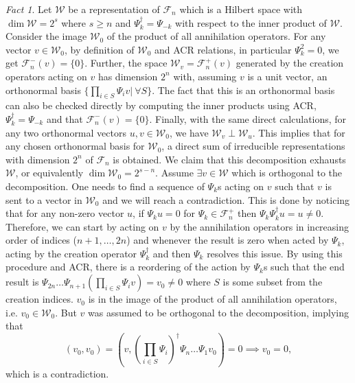 \documentclass[twoside,11pt,titlepage]{amsart}
\renewcommand{\=}[1]{\stackrel{#1}{=}} %
\theoremstyle{definition}
\theoremstyle{remark}
\newtheorem{fct}{Fact}
\begin{document}
\begin{fct}\label{fct1}
Let $\mathcal{W}$ be a representation of $\mathcal{F}_n$ which is a Hilbert space with $\dim \mathcal{W}=2^s$  where $s \ge n$ and $\Psi_k^\dagger=\Psi_{-k}$ with respect to the inner product of $\mathcal{W}$. Consider the image $\mathcal{W}_0$ of the product of all annihilation operators. For any vector $v \in \mathcal{W}_0$, by definition of $\mathcal{W}_0$ and ACR relations, in particular $\Psi_k^2=0$, we get $\mathcal{F}_n^-(v)=\{0\}$. Further, the space $\mathcal{W}_v=\mathcal{F}_n^+(v)$ generated by the creation operators acting on $v$ has dimension $2^n$ with, assuming $v$ is a unit vector, an orthonormal basis $\{\prod\limits_{i \in S} \Psi_{i} v| \ \forall S\}$. The fact that this is an orthonormal basis can also be checked directly by computing the inner products using ACR, $\Psi_k^\dagger=\Psi_{-k}$ and that $\mathcal{F}_n^-(v)=\{0\}$. Finally, with the same direct calculations, for any two orthonormal vectors $u,v \in \mathcal{W}_0$, we have $\mathcal{W}_v \perp \mathcal{W}_u$. This implies that for any chosen orthonormal basis for $\mathcal{W}_0$, a direct sum of irreducible representations with dimension $2^n$ of $\mathcal{F}_n$ is obtained. We claim that this decomposition exhausts $\mathcal{W}$, or equivalently $\dim \mathcal{W}_0=2^{s-n}$. Assume $\exists v \in \mathcal{W}$ which is orthogonal to the decomposition. One needs to find a sequence of $\Psi_k$s acting on $v$ such that $v$ is sent to a vector in $\mathcal{W}_0$ and we will reach a contradiction. This is done by noticing that for any non-zero vector $u$, if $\Psi_k u=0$ for $\Psi_k \in \mathcal{F}_n^{+}$ then $\Psi_{k}\Psi_{k}^\dagger u=u \neq 0$. Therefore, we can start by acting on $v$ by the annihilation operators in increasing order of indices ($n+1,\ldots,2n$) and whenever the result is zero when acted by $\Psi_k$, acting by the creation operator $\Psi_{k}^\dagger$ and then $\Psi_{k}$ resolves this issue. By using this procedure and ACR, there is a reordering of the action by $\Psi_k$s such that the end result is $\Psi_{2n} \ldots \Psi_{n+1}(\prod_{i \in S} \Psi_{i}v)=v_0 \neq 0$ where $S$ is some subset from the creation indices. $v_0$ is in the image of the    product of all annihilation operators, i.e. $v_0 \in \mathcal{W}_0$. But $v$ was assumed to be orthogonal to the decomposition, implying that
$$(v_0,v_0)=(v, (\prod_{i \in S} \Psi_{i})^\dagger \Psi_{n} \ldots \Psi_{1}v_0)=0 \implies v_0=0,$$
which is a contradiction.
\end{fct}
\end{document}
